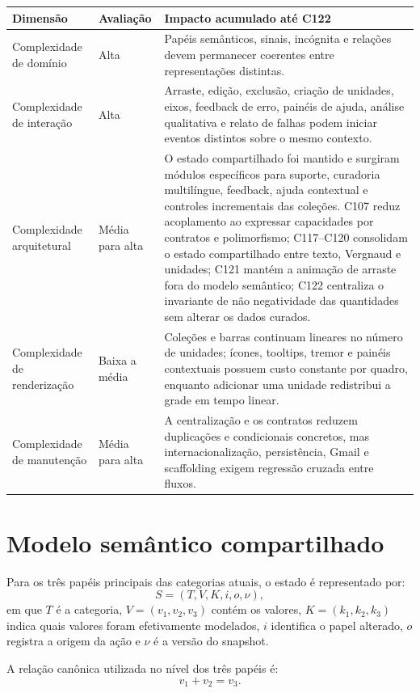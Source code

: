 \documentclass[12pt,a4paper]{article}
\begin{document}
\begin{tabularx}{\textwidth}{p{3.8cm}p{2.8cm}X}
\toprule
\textbf{Dimensão} & \textbf{Avaliação} & \textbf{Impacto acumulado até C122}\\
\midrule
Complexidade de domínio & Alta & Papéis semânticos, sinais, incógnita e relações devem permanecer coerentes entre representações distintas.\\
Complexidade de interação & Alta & Arraste, edição, exclusão, criação de unidades, eixos, feedback de erro, painéis de ajuda, análise qualitativa e relato de falhas podem iniciar eventos distintos sobre o mesmo contexto.\\
Complexidade arquitetural & Média para alta & O estado compartilhado foi mantido e surgiram módulos específicos para suporte, curadoria multilíngue, feedback, ajuda contextual e controles incrementais das coleções. C107 reduz acoplamento ao expressar capacidades por contratos e polimorfismo; C117--C120 consolidam o estado compartilhado entre texto, Vergnaud e unidades; C121 mantém a animação de arraste fora do modelo semântico; C122 centraliza o invariante de não negatividade das quantidades sem alterar os dados curados.\\
Complexidade de renderização & Baixa a média & Coleções e barras continuam lineares no número de unidades; ícones, tooltips, tremor e painéis contextuais possuem custo constante por quadro, enquanto adicionar uma unidade redistribui a grade em tempo linear.\\
Complexidade de manutenção & Média para alta & A centralização e os contratos reduzem duplicações e condicionais concretos, mas internacionalização, persistência, Gmail e scaffolding exigem regressão cruzada entre fluxos.\\
\bottomrule
\end{tabularx}

\section{Modelo semântico compartilhado}

Para os três papéis principais das categorias atuais, o estado é representado por:
\[
S = (T, V, K, i, o, \nu),
\]
em que $T$ é a categoria, $V=(v_1,v_2,v_3)$ contém os valores, $K=(k_1,k_2,k_3)$ indica quais valores foram efetivamente modelados, $i$ identifica o papel alterado, $o$ registra a origem da ação e $\nu$ é a versão do snapshot.

A relação canônica utilizada no nível dos três papéis é:
\[
v_1 + v_2 = v_3.
\]
\end{document}

